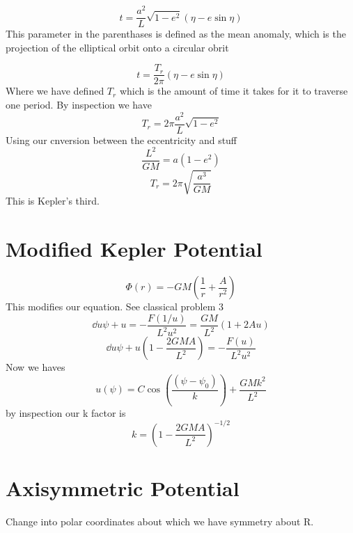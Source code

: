 \begin{equation}
t = \frac{a^2}{L} \sqrt{1-e^2} (\eta  - e\sin \eta)
\end{equation}
This parameter in the parenthases is defined as the mean anomaly, which is the projection of the elliptical orbit onto a circular obrit

\begin{equation}
t = \frac{T_r}{2\pi} ( \eta - e\sin\eta )
\end{equation}
Where we have defined $T_r$ which is the amount of time it takes for it to traverse one period. By inspection we have
\begin{equation}
T_r = 2\pi\frac{a^2}{L} \sqrt{1-e^2}
\end{equation}
Using our cnversion between the eccentricity and stuff
\begin{equation}
\frac{L^2}{GM} = a(1-e^2)
\end{equation}
\begin{equation}
T_r = 2\pi \sqrt{\frac{a^3}{GM}}
\end{equation}
This is Kepler's third.


\section{Modified Kepler Potential}
\begin{equation}
\Phi(r) = - GM(\frac{1}{r} + \frac{A}{r^2})
\end{equation}
This modifies our equation. See classical problem 3
\begin{equation}
\dd{u}{\psi} + u = - \frac{F(1/u)}{L^2 u^2} = \frac{GM}{L^2} (1 + 2Au)
\end{equation}
\begin{equation}
\dd{u}{\psi} + u(1 - \frac{2GMA}{L^2}) = -\frac{F(u)}{L^2 u^2}
\end{equation}
Now we haves
\begin{equation}
u(\psi) = C \cos\left( \frac{(\psi - \psi_0)}{k}\right) + \frac{GMk^2}{L^2}
\end{equation}
by inspection our k factor is
\begin{equation}
k = (1- \frac{2GMA}{L^2})^{-1/2}
\end{equation}


\section{Axisymmetric Potential}
Change into polar coordinates about which we have symmetry about R. 
